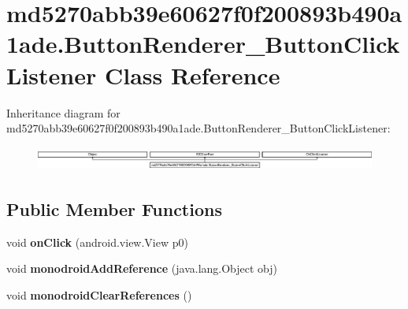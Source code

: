 \hypertarget{classmd5270abb39e60627f0f200893b490a1ade_1_1ButtonRenderer__ButtonClickListener}{}\section{md5270abb39e60627f0f200893b490a1ade.\+Button\+Renderer\+\_\+\+Button\+Click\+Listener Class Reference}
\label{classmd5270abb39e60627f0f200893b490a1ade_1_1ButtonRenderer__ButtonClickListener}
Inheritance diagram for md5270abb39e60627f0f200893b490a1ade.\+Button\+Renderer\+\_\+\+Button\+Click\+Listener\+:\begin{figure}[H]
\begin{center}
\leavevmode
\includegraphics[height=0.797721cm]{classmd5270abb39e60627f0f200893b490a1ade_1_1ButtonRenderer__ButtonClickListener}
\end{center}
\end{figure}
\subsection*{Public Member Functions}
\begin{DoxyCompactItemize}
\item 
\mbox{\label{classmd5270abb39e60627f0f200893b490a1ade_1_1ButtonRenderer__ButtonClickListener_a498d522f10f3d9a972aae4d52698573f}} 
void {\bfseries on\+Click} (android.\+view.\+View p0)
\item 
\mbox{\label{classmd5270abb39e60627f0f200893b490a1ade_1_1ButtonRenderer__ButtonClickListener_a86f4e14df96aec81f38a28a5d72f0edf}} 
void {\bfseries monodroid\+Add\+Reference} (java.\+lang.\+Object obj)
\item 
\mbox{\label{classmd5270abb39e60627f0f200893b490a1ade_1_1ButtonRenderer__ButtonClickListener_a3ad2ca4f3a271cf9d78dd0f3c022a69b}} 
void {\bfseries monodroid\+Clear\+References} ()
\end{DoxyCompactItemize}
